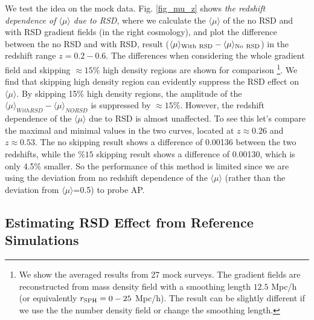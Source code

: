 \documentclass{emulateapj}
\begin{document}
We test the idea on the mock data.
Fig. \ref{fig_mu_z} shows {\it the redshift dependence of $\langle\mu\rangle$ due to RSD},
where we calculate the $\langle\mu\rangle$ of the no RSD and with RSD gradient fields (in the right cosmology),
and plot the difference between the no RSD and with RSD, result 
($\langle\mu\rangle_{\rm With\ RSD}-\langle\mu\rangle_{\rm No\ RSD}$) in the redshift range $z=0.2-0.6$.
The differences when considering the whole gradient field and skipping $\approx15\%$ high density regions are shown for comparison
\footnote{We show the averaged results from 27 mock surveys. 
The gradient fields are reconstructed from mass density field with a smoothing length $12.5$ Mpc/h 
(or equivalently $r_{\rm SPH}=0-25$ Mpc/h).
The result can be slightly different if we use the the number density field or change the smoothing length.}.
We find that skipping high density region can evidently suppress the RSD effect on $\langle\mu\rangle$.
By skipping 15\% high density regions,
the amplitude of the $\langle\mu\rangle_{WithRSD}-\langle\mu\rangle_{NORSD}$ is suppressed by $\approx15\%$.
However, the redshift dependence of the $\langle\mu\rangle$ due to RSD is almost unaffected.
To see this let's compare the maximal and minimal values in the two curves, 
located at $z\approx0.26$ and $z\approx0.53$.
The no skipping result shows a difference of 0.00136 between the two redshifts, 
while the $\%15$ skipping result shows a difference of 0.00130, which is only 4.5\% smaller.
So the performance of this method is limited since we are using the deviation from no redshift dependence of the $\langle\mu\rangle$
(rather than the deviation from $\langle\mu\rangle$=0.5) to probe AP.
 
\subsection{Estimating RSD Effect from Reference Simulations}
\label{sec_corec_ref_sim}
\end{document}
